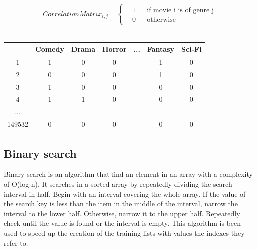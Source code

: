 \documentclass{article}
\begin{document}
\begin{equation}
      \label{eqn:movieMatrix}
      CorrelationMatrix_{i,j} = \left \{
            \begin{aligned}
                  &1 && \text{if movie i is of genre j}\\
                  &0 && \text{otherwise}
            \end{aligned} \right.
\end{equation} \\ 

\begin{center}
      \begin{tabular}{ | c | c | c | c | c | c | c |} 
        \hline
        \rowcolor{lightgray}  & Comedy & Drama & Horror & ... & Fantasy & Sci-Fi \\ 
        \hline
         \cellcolor{lightgray}1 & 1 & 0 & 0 &  & 1 & 0 \\ 
        \hline
        \cellcolor{lightgray}2 & 0 & 0 & 0 &  & 1 & 0 \\ 
        \hline
        \cellcolor{lightgray}3 & 1 & 0 & 0 &  & 0 & 0\\
        \hline
        \cellcolor{lightgray}4 & 1 & 1 & 0 &  & 0 & 0\\
        \hline
        \cellcolor{lightgray}... &  &  &  &  &  & \\ 
        \hline
        \cellcolor{lightgray}149532 & 0 & 0 & 0 &  & 0 & 0\\
        \hline
      \end{tabular}
\end{center}

\newpage
\subsection{Binary search}
Binary search is an algorithm that find an element in an array with a complexity of O(log n). It searches in a sorted array by repeatedly dividing the search interval in half. Begin with an interval covering the whole array. If the value of the search key is less than the item in the middle of the interval, narrow the interval to the lower half. Otherwise, narrow it to the upper half. Repeatedly check until the value is found or the interval is empty.
This algorithm is been used to speed up the creation of the training lists with values the indexes they refer to.\\
\end{document}
